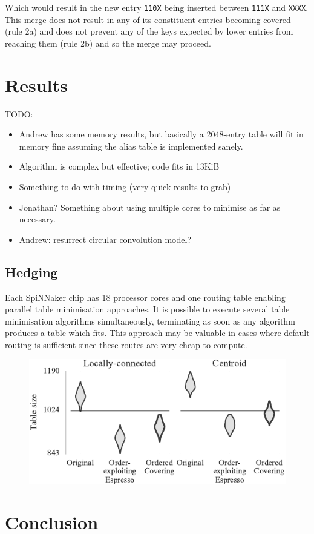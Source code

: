 \documentclass[conference]{IEEEtran}
\newcommand{\mytt}[1]{\texttt{\footnotesize#1}}
\begin{document}
  Which would result in the new entry \mytt{110X} being inserted between \mytt{111X} and \mytt{XXXX}.
  This merge does not result in any of its constituent entries becoming covered (rule 2a) and does not prevent any of the keys expected by lower entries from reaching them (rule 2b) and so the merge may proceed.

  \section{Results}

  TODO:
  \begin{itemize}
    \item Andrew has some memory results, but basically a 2048-entry table will fit in memory fine assuming the alias table is implemented sanely.
    \item Algorithm is complex but effective; code fits in 13KiB
    \item Something to do with timing (very quick results to grab)
    \item Jonathan? Something about using multiple cores to minimise as far as necessary.
    \item Andrew: resurrect circular convolution model?
  \end{itemize}
  
    \subsection{Hedging}
    
       Each SpiNNaker chip has 18 processor cores and one routing table enabling parallel table minimisation approaches.
       It is possible to execute several table minimisation algorithms simultaneously, terminating as soon as any algorithm produces a table which fits.
       This approach may be valuable in cases where default routing is sufficient since these routes are very cheap to compute.

\begin{figure}
  \centering
  \includegraphics{experiments/results_esp_and_oc}
\end{figure}

  \section{Conclusion}

\printbibliography
\end{document}
